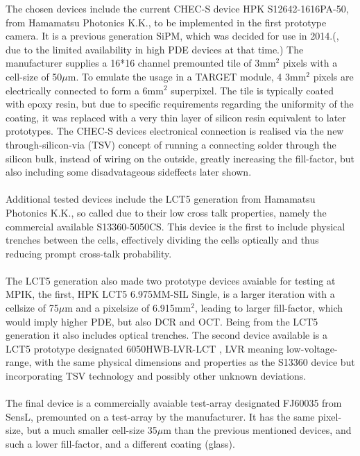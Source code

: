 \documentclass[12pt,article,type=msc,colorback,accentcolor=tud9c]{tudthesis}
\begin{document}
The chosen devices include the current CHEC-S device HPK S12642-1616PA-50, from Hamamatsu Photonics K.K., to be implemented in the first prototype camera. It is a previous generation SiPM, which was decided for use in 2014.(, due to the limited availability in high PDE devices at that time.) The manufacturer supplies a 16*16 channel premounted tile of 3mm$^2$ pixels with a cell-size of 50$\mu$m. To emulate the usage in a TARGET module, 4 3mm$^2$ pixels are electrically connected to form a 6mm$^2$ superpixel. The tile is typically coated with epoxy resin, but due to specific requirements regarding the uniformity of the coating, it was replaced with a very thin layer of silicon resin equivalent to later prototypes. The CHEC-S devices electronical connection is realised via the new through-silicon-via (TSV) concept of running a connecting solder through the silicon bulk, instead of wiring on the outside, greatly increasing the fill-factor, but also including some disadvatageous sideffects later shown.\\\\
Additional tested devices include the LCT5 generation from Hamamatsu Photonics K.K., so called due to their low cross talk properties, namely the commercial available S13360-5050CS. This device is the first to include physical trenches between the cells, effectively dividing the cells optically and thus reducing prompt cross-talk probability.\\\\
The LCT5 generation also made two prototype devices avaiable for testing at MPIK, the first, HPK LCT5 6.975MM-SIL Single, is a larger iteration with a cellsize of 75$\mu$m and a pixelsize of 6.915mm$^2$, leading to larger fill-factor, which would imply higher PDE, but also DCR and OCT. Being from the LCT5 generation it also includes optical trenches. The second device available is a LCT5 prototype designated 6050HWB-LVR-LCT , LVR meaning low-voltage-range, with the same physical dimensions and properties as the S13360 device but incorporating TSV technology and possibly other unknown deviations.\\\\
The final device is a commercially avaiable test-array designated FJ60035 from SensL, premounted on a test-array by the manufacturer. It has the same pixel-size, but a much smaller cell-size 35$\mu$m than the previous mentioned devices, and such a lower fill-factor, and a different coating (glass).\\\\
\end{document}
